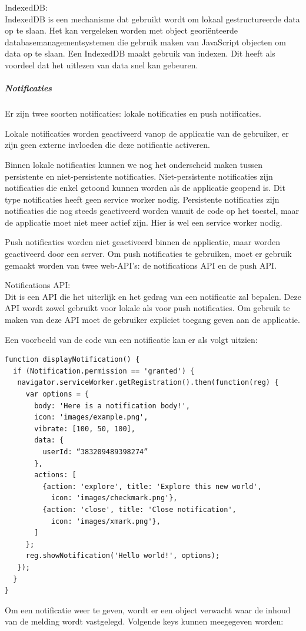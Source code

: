			IndexedDB: \\

				IndexedDB is een mechanisme dat gebruikt wordt om lokaal gestructureerde data op te slaan. Het kan vergeleken worden met object georiënteerde databasemanagementsystemen die gebruik maken van JavaScript objecten om data op te slaan. Een IndexedDB maakt gebruik van indexen. Dit heeft als voordeel dat het uitlezen van data snel kan gebeuren.
				\autocite{Mozilla2019}
	
	
	\subparagraph{Notificaties}
	
		Er zijn twee soorten notificaties: lokale notificaties en push notificaties. 
		
		Lokale notificaties worden geactiveerd vanop de applicatie van de gebruiker, er zijn geen externe invloeden die deze notificatie activeren.
		
		Binnen lokale notificaties kunnen we nog het onderscheid maken tussen persistente en niet-persistente notificaties.
		Niet-persistente notificaties zijn notificaties die enkel getoond kunnen worden als de applicatie geopend is. Dit type notificaties heeft geen service worker nodig. 
		Persistente notificaties zijn notificaties die nog steeds geactiveerd worden vanuit de code op het toestel, maar de applicatie moet niet meer actief zijn. Hier is wel een service worker nodig.
	
		Push notificaties worden niet geactiveerd binnen de applicatie, maar worden geactiveerd door een server.
		Om push notificaties te gebruiken, moet er gebruik gemaakt worden van twee web-API's: de notifications API en de push API.
		
		Notifications API: \\
		
			Dit is een API die het uiterlijk en het gedrag van een notificatie zal bepalen. Deze API wordt zowel gebruikt voor lokale als voor push notificaties.
			Om gebruik te maken van deze API moet de gebruiker expliciet toegang geven aan de applicatie.
			
			Een voorbeeld van de code van een notificatie kan er als volgt uitzien:
		
\begin{lstlisting}
function displayNotification() {
  if (Notification.permission == 'granted') {
   navigator.serviceWorker.getRegistration().then(function(reg) {
     var options = {
       body: 'Here is a notification body!',
       icon: 'images/example.png',
       vibrate: [100, 50, 100],
       data: {
         userId: “383209489398274”
       },
       actions: [
         {action: 'explore', title: 'Explore this new world',
           icon: 'images/checkmark.png'},
         {action: 'close', title: 'Close notification',
           icon: 'images/xmark.png'},
       ]
     };
     reg.showNotification('Hello world!', options);
   });
  }
}
\end{lstlisting}
			Om een notificatie weer te geven, wordt er een object verwacht waar de inhoud van de melding wordt vastgelegd. Volgende keys kunnen meegegeven worden:
			
